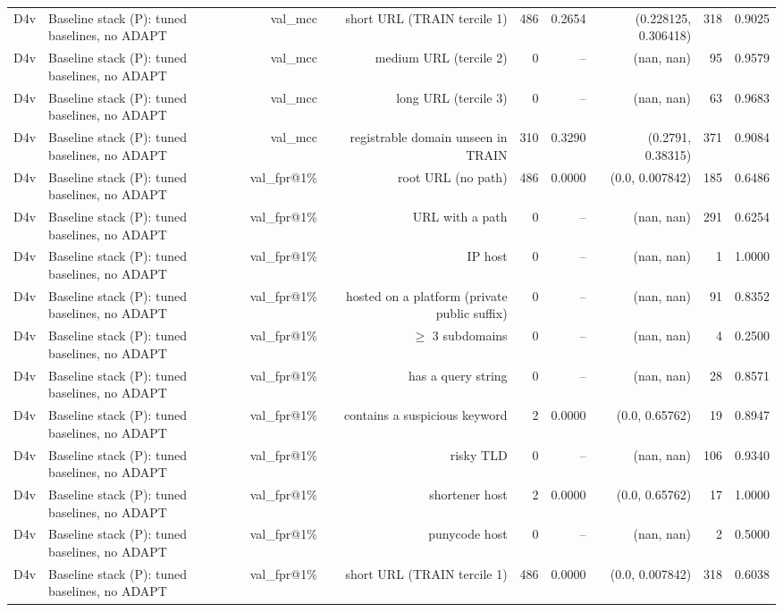 \begin{table}[t]
\begin{tabular}{llrrrrrrr}
D4v & Baseline stack (P): tuned baselines, no ADAPT & val\_mcc & short URL (TRAIN tercile 1) & 486 & 0.2654 & (0.228125, 0.306418) & 318 & 0.9025 \\
D4v & Baseline stack (P): tuned baselines, no ADAPT & val\_mcc & medium URL (tercile 2) & 0 & -- & (nan, nan) & 95 & 0.9579 \\
D4v & Baseline stack (P): tuned baselines, no ADAPT & val\_mcc & long URL (tercile 3) & 0 & -- & (nan, nan) & 63 & 0.9683 \\
D4v & Baseline stack (P): tuned baselines, no ADAPT & val\_mcc & registrable domain unseen in TRAIN & 310 & 0.3290 & (0.2791, 0.38315) & 371 & 0.9084 \\
D4v & Baseline stack (P): tuned baselines, no ADAPT & val\_fpr@1\% & root URL (no path) & 486 & 0.0000 & (0.0, 0.007842) & 185 & 0.6486 \\
D4v & Baseline stack (P): tuned baselines, no ADAPT & val\_fpr@1\% & URL with a path & 0 & -- & (nan, nan) & 291 & 0.6254 \\
D4v & Baseline stack (P): tuned baselines, no ADAPT & val\_fpr@1\% & IP host & 0 & -- & (nan, nan) & 1 & 1.0000 \\
D4v & Baseline stack (P): tuned baselines, no ADAPT & val\_fpr@1\% & hosted on a platform (private public suffix) & 0 & -- & (nan, nan) & 91 & 0.8352 \\
D4v & Baseline stack (P): tuned baselines, no ADAPT & val\_fpr@1\% & $\geq$ 3 subdomains & 0 & -- & (nan, nan) & 4 & 0.2500 \\
D4v & Baseline stack (P): tuned baselines, no ADAPT & val\_fpr@1\% & has a query string & 0 & -- & (nan, nan) & 28 & 0.8571 \\
D4v & Baseline stack (P): tuned baselines, no ADAPT & val\_fpr@1\% & contains a suspicious keyword & 2 & 0.0000 & (0.0, 0.65762) & 19 & 0.8947 \\
D4v & Baseline stack (P): tuned baselines, no ADAPT & val\_fpr@1\% & risky TLD & 0 & -- & (nan, nan) & 106 & 0.9340 \\
D4v & Baseline stack (P): tuned baselines, no ADAPT & val\_fpr@1\% & shortener host & 2 & 0.0000 & (0.0, 0.65762) & 17 & 1.0000 \\
D4v & Baseline stack (P): tuned baselines, no ADAPT & val\_fpr@1\% & punycode host & 0 & -- & (nan, nan) & 2 & 0.5000 \\
D4v & Baseline stack (P): tuned baselines, no ADAPT & val\_fpr@1\% & short URL (TRAIN tercile 1) & 486 & 0.0000 & (0.0, 0.007842) & 318 & 0.6038 \\

\end{tabular}
\end{table}
